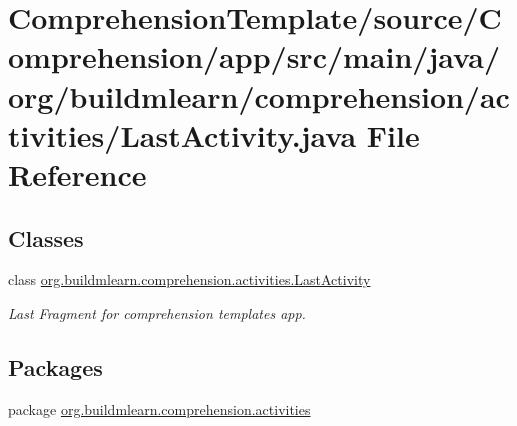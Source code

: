 \hypertarget{ComprehensionTemplate_2source_2Comprehension_2app_2src_2main_2java_2org_2buildmlearn_2comprehensc745d6c8b45cfa53359db2a5d3aa7e29}{}\section{Comprehension\+Template/source/\+Comprehension/app/src/main/java/org/buildmlearn/comprehension/activities/\+Last\+Activity.java File Reference}
\label{ComprehensionTemplate_2source_2Comprehension_2app_2src_2main_2java_2org_2buildmlearn_2comprehensc745d6c8b45cfa53359db2a5d3aa7e29}
\subsection*{Classes}
\begin{DoxyCompactItemize}
\item 
class \hyperlink{classorg_1_1buildmlearn_1_1comprehension_1_1activities_1_1LastActivity}{org.\+buildmlearn.\+comprehension.\+activities.\+Last\+Activity}
\begin{DoxyCompactList}\small\item\em Last Fragment for comprehension template\textquotesingle{}s app. \end{DoxyCompactList}\end{DoxyCompactItemize}
\subsection*{Packages}
\begin{DoxyCompactItemize}
\item 
package \hyperlink{namespaceorg_1_1buildmlearn_1_1comprehension_1_1activities}{org.\+buildmlearn.\+comprehension.\+activities}
\end{DoxyCompactItemize}
